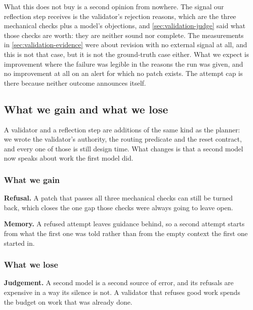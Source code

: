 What this does not buy is a second opinion from nowhere. The signal our reflection step receives is
the validator's rejection reasons, which are the three mechanical checks plus a model's objections,
and \cref{sec:validation-judge} said what those checks are worth: they are neither sound nor
complete. The measurements in \cref{sec:validation-evidence} were about revision with no external
signal at all, and this is not that case, but it is not the ground-truth case either. What we expect
is improvement where the failure was legible in the reasons the run was given, and no improvement at
all on an alert for which no patch exists. The attempt cap is there because neither outcome
announces itself.

\subsection{What we gain and what we lose}
\label{sec:validation-tradeoff}

A validator and a reflection step are additions of the same kind as the planner: we wrote the
validator's authority, the routing predicate and the reset contract, and every one of those is
still design time. What changes is that a second model now speaks about work the first model did.

\subsubsection{What we gain}

\bi

\item \textbf{Refusal.} A patch that passes all three mechanical checks can still be turned back,
which closes the one gap those checks were always going to leave open.

\item \textbf{Memory.} A refused attempt leaves guidance behind, so a second attempt starts from
what the first one was told rather than from the empty context the first one started in.

\ei

\subsubsection{What we lose}

\bi

\item \textbf{Judgement.} A second model is a second source of error, and its refusals are
expensive in a way its silence is not. A validator that refuses good work spends the budget on work
that was already done.

